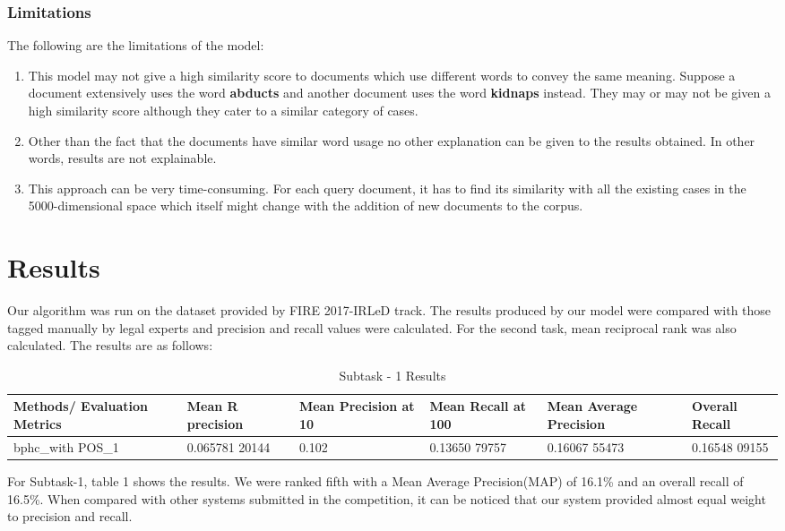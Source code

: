 \subsubsection{Limitations}
The following are the limitations of the model:
\begin{enumerate}
	\item This model may not give a high similarity score to documents which use different words to convey the same meaning. Suppose a document extensively uses the word \textbf{abducts} and another document uses the word \textbf{kidnaps} instead. They may or may not be given a high similarity score although they cater to a similar category of cases.
	\item Other than the fact that the documents have similar word usage no other explanation can be given to the results obtained. In other words, results are not explainable.
	\item This approach can be very time-consuming. For each query document, it has to find its similarity with all the existing cases in the 5000-dimensional space which itself might change with the addition of new documents to the corpus.
\end{enumerate}
\section{Results}
Our algorithm was run on the dataset provided by FIRE 2017-IRLeD track. The results produced by our model were compared with those tagged manually by legal experts and precision and recall values were calculated. For the second task, mean reciprocal rank was also calculated. The results are as follows:\par

\begin{table}[H]
\caption{Subtask - 1 Results}
\begin{tabularx}{\linewidth}{|L|L|L|L|L|L|}
    \hline
    Methods/ Evaluation Metrics & Mean R precision & Mean Precision at 10 & Mean Recall at 100 & Mean Average Precision & Overall Recall \\
    \hline
     bphc\_with POS\_1 & 0.065781 20144 & 0.102 & 0.13650 79757 & 0.16067 55473 & 0.16548 09155 \\
     \hline
\end{tabularx}
\end{table}

For Subtask-1, table 1 shows the results. We were ranked fifth with a Mean Average Precision(MAP) of 16.1\% and an overall recall of 16.5\%. When compared with other systems submitted in the competition, it can be noticed that our system provided almost equal weight to precision and recall. \par

